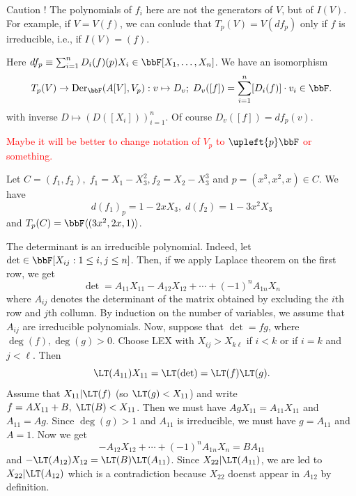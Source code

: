 \begin{itemize}
  \begin{remark}
    Caution ! The polynomials of $f_i$ here are not the generators of $V$, but of $I(V)$. For example, if 
    $V=V(f)$, we can conlude that $T_p(V) = V(df_p)$ only if $f$ is irreducible, i.e., if $I(V)=(f)$.
  \end{remark}
  Here $df_p\equiv \sum_{i=1}^nD_i(f)(p)X_i\in\bbF[X_1,\dots,X_n]$. We have an isomorphism
  \begin{equation}
    T_p(V)\rightarrow \text{Der}_{\bbF}(A[V],V_p):v\mapsto D_v;\;D_v([f])=\sum_{i=1}^n[D_i(f)]\cdot v_i\in\bbF.
  \end{equation}
  with inverse $D\mapsto (D([X_i]))_{i=1}^n$. Of course $D_v([f])=df_p(v)$.
  \begin{center}
    \textcolor{red}{Maybe it will be better to change notation of $V_p$ to $\upleft{p}\bbF$ or something.}
  \end{center}
  \begin{example}
    Let $C=(f_1,f_2),\;f_1=X_1-X_3^2, f_2=X_2-X_3^3$ and $p=(x^3,x^2,x)\in C$. We have 
    \begin{equation}
        d(f_1)_p = 1 - 2x X_3,\;d(f_2) = 1 - 3x^2 X_3 
    \end{equation}
    and $T_p(C)=\bbF\langle(3x^2,2x,1)\rangle$.
  \end{example} 

  \begin{example}
    The determinant is an irreducible polynomial. Indeed, let $\det\in\bbF[X_{ij}:1\leq i,j\leq n]$. Then, if we apply Laplace theorem
    on the first row, we get 
    \begin{equation}
        \det = A_{11} X_{11} - A_{12}X_{12} +\cdots+(-1)^nA_{1n}X_n
    \end{equation}
    where $A_{ij}$ denotes the determinant of the matrix obtained by excluding the $i$th row and $j$th collumn. By induction on 
    the number of variables, we assume that $A_{ij}$ are irreducible polynomials. Now, suppose that 
    $\det = fg$, where $\deg(f),\deg(g)>0$. Choose LEX with $X_{ij}>X_{k\ell}$ if $i<k$ or if $i=k$ and $j<\ell$. Then 
    \begin{equation}
     \LT(A_{11})X_{11} =  \LT(\det) = \LT(f)\LT(g).
    \end{equation}
    Assume that $X_{11}|\LT(f)$ (so $\LT(g)<X_{11}$) and write $f=AX_{11}+B,\;\LT(B)<X_{11}$. 
    Then we must have $AgX_{11}=A_{11}X_{11}$ and $A_{11}=Ag$. Since $\deg(g)>1$ and $A_{11}$ is irreducible, we must have 
    $g=A_{11}$ and $A=1$. Now we get 
    \begin{equation}
        - A_{12}X_{12} +\cdots+(-1)^nA_{1n}X_n = BA_{11}
    \end{equation}
    and $-\LT(A_{12})X_{12} = \LT(B)\LT(A_{11})$. Since $X_{22}|\LT(A_{11})$, we are led to $X_{22}|\LT(A_{12})$ which is 
    a contradiction because $X_{22}$ doenst appear in $A_{12}$ by definition.\par 


\end{example}
\end{itemize}
